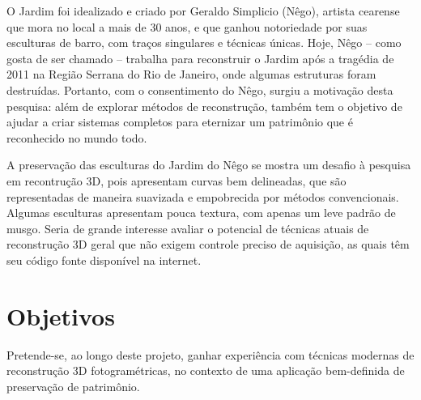 

O Jardim foi idealizado e criado por Geraldo Simplicio (Nêgo), artista cearense que mora no
local a mais de 30 anos, e que ganhou notoriedade por suas esculturas de barro,
com traços singulares e técnicas únicas. Hoje, Nêgo -- como gosta de ser chamado
-- trabalha para reconstruir o Jardim após a tragédia de 2011 na Região Serrana
do Rio de Janeiro, onde algumas estruturas foram destruídas. Portanto, com o
consentimento do Nêgo, surgiu a motivação desta pesquisa: além de explorar
métodos de reconstrução, também tem o objetivo de ajudar a criar sistemas
completos para eternizar um patrimônio que é reconhecido no mundo todo.

A preservação das esculturas do Jardim do Nêgo se mostra um desafio à pesquisa em
recontrução 3D, pois apresentam curvas bem delineadas, que são 
representadas de maneira suavizada e empobrecida por métodos convencionais.
Algumas esculturas apresentam pouca textura, com apenas um leve padrão de musgo.
Seria de grande interesse avaliar o potencial de técnicas atuais de
reconstrução 3D geral que não exigem controle preciso de aquisição, as quais têm seu código fonte
disponível na internet.

\newpage

\section{Objetivos}\label{sec:objetivos}

Pretende-se, ao longo deste projeto, ganhar experiência com técnicas
modernas de reconstrução 3D fotogramétricas, no contexto de uma aplicação
bem-definida de preservação de patrimônio. 

